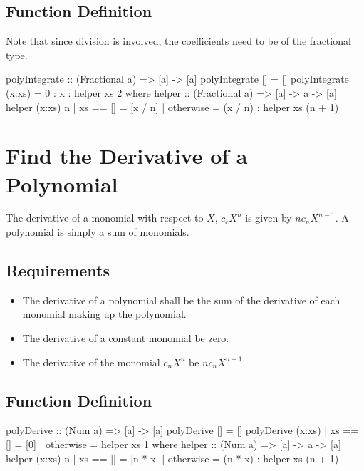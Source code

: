 \subsection{Function Definition}
Note that since division is involved, the coefficients need to be of the fractional type.
\begin{code}
polyIntegrate :: (Fractional a) => [a] -> [a]
polyIntegrate [] = []
polyIntegrate (x:xs) = 0 : x : helper xs 2
  where
    helper :: (Fractional a) => [a] -> a -> [a]
    helper (x:xs) n
      | xs == []  = [x / n]
      | otherwise = (x / n) : helper xs (n + 1)
\end{code}

\section{Find the Derivative of a Polynomial}
The derivative of a monomial with respect to $X$, $c_{c}X^n$ is given by $nc_{n}X^{n-1}$.  A polynomial is simply a sum of monomials.

\subsection{Requirements}
\begin{itemize}
\item The derivative of a polynomial  shall be the sum of the derivative of each monomial making up the polynomial.
\item The derivative of a constant monomial  be zero.
\item The derivative of the monomial $c_{n}X^n$  be $nc_{n}X^{n-1}$.
\end{itemize}

\subsection{Function Definition}
\begin{code}
polyDerive :: (Num a) => [a] -> [a]
polyDerive [] = []
polyDerive (x:xs)
  | xs == []  = [0]
  | otherwise = helper xs 1
  where
    helper :: (Num a) => [a] -> a -> [a]
    helper (x:xs) n
      | xs == []  = [n * x]
      | otherwise = (n * x) : helper xs (n + 1)
\end{code}

